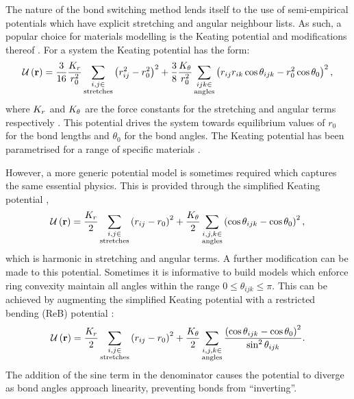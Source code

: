 The nature of the bond switching method lends itself to the use of semi\--empirical potentials which have explicit stretching and angular neighbour lists.
As such, a popular choice for materials modelling is the Keating potential and modifications thereof \cite{Keating1966,Barkema2000}. 
For a \td{} system the Keating potential has the form:
\begin{equation}
	\label{eq:keating}
	\mathcal{U}\left(\mathbf{r}\right) = \frac{3}{16}\frac{K_r}{r_0^2}\sum_{\substack{i,j \in \\ \text{stretches}}} \left(r_{ij}^2-r_0^2\right)^2+
	\frac{3}{8}\frac{K_\theta}{r_0^2}\sum_{\substack{ijk \in \\ \text{angles}}}\left(r_{ij}r_{ik}\cos\theta_{ijk}-r_0^2\cos\theta_0\right)^2 ,
\end{equation}
where $K_r$ and $K_\theta$ are the force constants for the stretching and angular terms respectively \cite{Kumar2012}.
This potential drives the system towards equilibrium values of $r_0$ for the bond lengths and $\theta_0$ for the bond angles.
The Keating potential has been parametrised for a range of specific materials \cite{Kumar2012,Drabold2009}. 

However, a more generic potential model is sometimes required which captures the same essential physics.
This is provided through the simplified Keating potential \cite{VonAlfthan2003},
\begin{equation}
	\mathcal{U}\left(\mathbf{r}\right) = \frac{K_r}{2}\sum_{\substack{i,j\in \\ \text{stretches}}}\left(r_{ij}-r_0\right)^2 + \frac{K_\theta}{2}\sum_{\substack{i,j,k \in \\ \text{angles}}} \left(\cos\theta_{ijk}-\cos\theta_0\right)^2,
\end{equation}
which is harmonic in stretching and angular terms.
A further modification can be made to this potential. 
Sometimes it is informative to build models which enforce ring convexity \ie{} maintain all angles within the range $0\leq \theta_{ijk} \leq \pi$.
This can be achieved by augmenting the simplified Keating potential with a restricted bending (ReB) potential \cite{Bulacu2013}:
\begin{equation}
	\mathcal{U}\left(\mathbf{r}\right) = \frac{K_r}{2}\sum_{\substack{i,j\in \\ \text{stretches}}}\left(r_{ij}-r_0\right)^2 + \frac{K_\theta}{2}\sum_{\substack{i,j,k \in \\ \text{angles}}} \frac{\left(\cos\theta_{ijk}-\cos\theta_0\right)^2}{\sin^{2}\theta_{ijk}}.
\end{equation}
The addition of the sine term in the denominator causes the potential to diverge as bond angles approach linearity, preventing bonds from ``inverting''.

